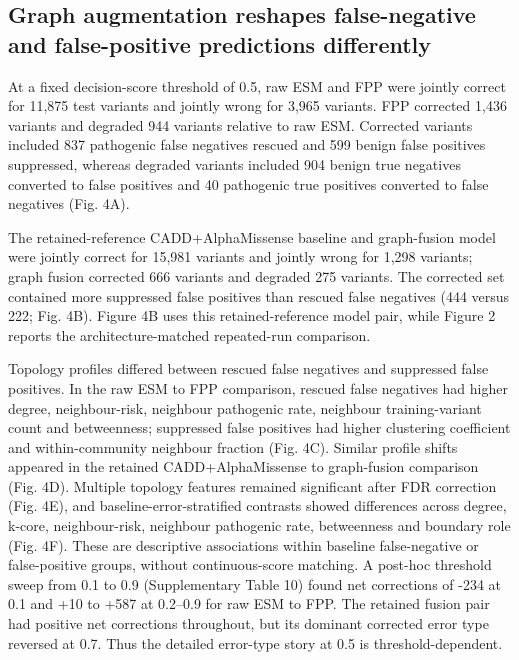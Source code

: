 \documentclass[conference]{IEEEtran}
\newcommand{\CADDAM}{CADD\allowbreak{}+\allowbreak{}AlphaMissense}
\begin{document}
\subsection{Graph augmentation reshapes false-negative and false-positive predictions differently}

At a fixed decision-score threshold of 0.5, raw ESM and FPP were jointly correct for 11,875 test variants and jointly wrong for 3,965 variants. FPP corrected 1,436 variants and degraded 944 variants relative to raw ESM. Corrected variants included 837 pathogenic false negatives rescued and 599 benign false positives suppressed, whereas degraded variants included 904 benign true negatives converted to false positives and 40 pathogenic true positives converted to false negatives (Fig. 4A).

The retained-reference \CADDAM{} baseline and graph-fusion model were jointly correct for 15,981 variants and jointly wrong for 1,298 variants; graph fusion corrected 666 variants and degraded 275 variants. The corrected set contained more suppressed false positives than rescued false negatives (444 versus 222; Fig. 4B). Figure 4B uses this retained-reference model pair, while Figure 2 reports the architecture-matched repeated-run comparison.

Topology profiles differed between rescued false negatives and suppressed false positives. In the raw ESM to FPP comparison, rescued false negatives had higher degree, neighbour-risk, neighbour pathogenic rate, neighbour training-variant count and betweenness; suppressed false positives had higher clustering coefficient and within-community neighbour fraction (Fig. 4C). Similar profile shifts appeared in the retained \CADDAM{} to graph-fusion comparison (Fig. 4D). Multiple topology features remained significant after FDR correction (Fig. 4E), and baseline-error-stratified contrasts showed differences across degree, k-core, neighbour-risk, neighbour pathogenic rate, betweenness and boundary role (Fig. 4F). These are descriptive associations within baseline false-negative or false-positive groups, without continuous-score matching. A post-hoc threshold sweep from 0.1 to 0.9 (Supplementary Table 10) found net corrections of -234 at 0.1 and +10 to +587 at 0.2--0.9 for raw ESM to FPP. The retained fusion pair had positive net corrections throughout, but its dominant corrected error type reversed at 0.7. Thus the detailed error-type story at 0.5 is threshold-dependent.
\end{document}
